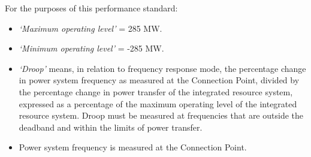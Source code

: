 For the purposes of this performance standard:
\begin{itemize}
	\item \textit{‘Maximum operating level’} = 285 MW.
	\item \textit{‘Minimum operating level’} = -285 MW.
	\item \textit{‘Droop’} means, in relation to frequency response mode, the percentage change in power system frequency as measured at the Connection Point, divided by the percentage change in power transfer of the integrated resource system, expressed as a percentage of the maximum operating level of the integrated resource system.  Droop must be measured at frequencies that are outside the deadband and within the limits of power transfer.
	\item Power system frequency is measured at the Connection Point.
\end{itemize}

